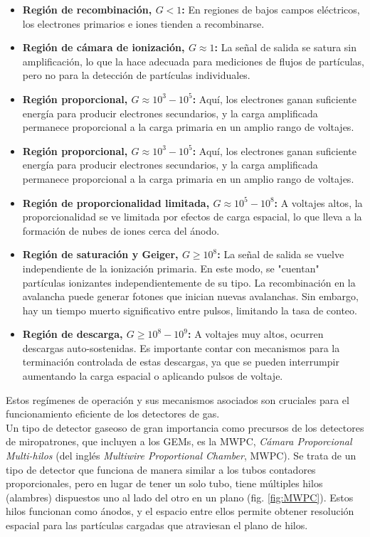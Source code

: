\documentclass{article}
\begin{document}
\begin{itemize}
    \item \textbf{Región de recombinación, \(G < 1\):} En regiones de bajos campos eléctricos, los electrones primarios e iones tienden a recombinarse.
    \item \textbf{Región de cámara de ionización, \(G \approx 1\):} La señal de salida se satura sin amplificación, lo que la hace adecuada para mediciones de flujos de partículas, pero no para la detección de partículas individuales.
    \item \textbf{Región proporcional, \(G \approx 10^3 - 10^5\):} Aquí, los electrones ganan suficiente energía para producir electrones secundarios, y la carga amplificada permanece proporcional a la carga primaria en un amplio rango de voltajes.
    \item \textbf{Región proporcional, \(G \approx 10^3 - 10^5\):} Aquí, los electrones ganan suficiente energía para producir electrones secundarios, y la carga amplificada permanece proporcional a la carga primaria en un amplio rango de voltajes.
    \item \textbf{Región de proporcionalidad limitada, \(G \approx 10^5 - 10^8\):} A voltajes altos, la proporcionalidad se ve limitada por efectos de carga espacial, lo que lleva a la formación de nubes de iones cerca del ánodo.
    \item \textbf{Región de saturación y Geiger, \(G \geq 10^8\):} La señal de salida se vuelve independiente de la ionización primaria. En este modo, se "cuentan" partículas ionizantes independientemente de su tipo. La recombinación en la avalancha puede generar fotones que inician nuevas avalanchas. Sin embargo, hay un tiempo muerto significativo entre pulsos, limitando la tasa de conteo.
    \item \textbf{Región de descarga, \(G \geq 10^8 - 10^9\):} A voltajes muy altos, ocurren descargas auto-sostenidas. Es importante contar con mecanismos para la terminación controlada de estas descargas, ya que se pueden interrumpir aumentando la carga espacial o aplicando pulsos de voltaje.
\end{itemize}

\noindent Estos regímenes de operación y sus mecanismos asociados son cruciales para el funcionamiento eficiente de los detectores de gas.\\

\noindent Un tipo de detector gaseoso de gran importancia como precursos de los detectores de miropatrones, que incluyen a los GEMs, es la MWPC, \textit{Cámara Proporcional Multi-hilos} (del inglés \textit{Multiwire Proportional Chamber}, MWPC). Se trata de un tipo de detector que funciona de manera similar a los tubos contadores proporcionales, pero en lugar de tener un solo tubo, tiene múltiples hilos (alambres) dispuestos uno al lado del otro en un plano (fig. \ref{fig:MWPC}). Estos hilos funcionan como ánodos, y el espacio entre ellos permite obtener resolución espacial para las partículas cargadas que atraviesan el plano de hilos.
\end{document}

